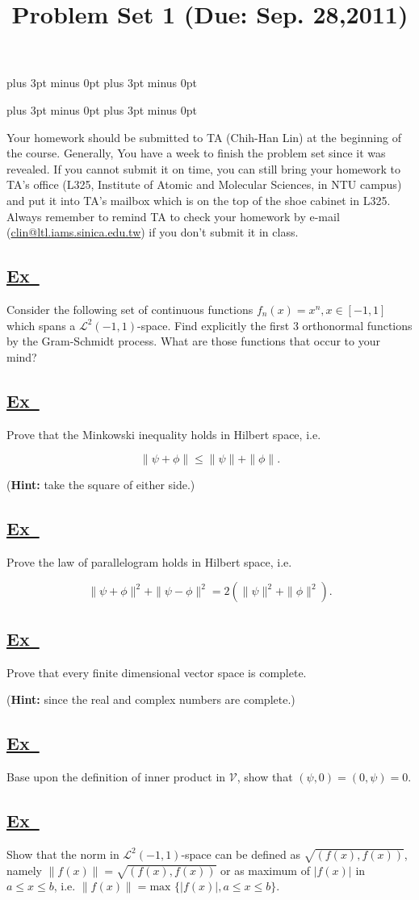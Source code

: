 \documentclass[a4paper,12pt]{article}
\newcommand{\excercise}{\addtocounter{section}{+1}
\subsection*{\underline{Ex~\thesection}}}
\newcommand{\norm}[1]{\|#1\|}
\begin{document}
\abovedisplayskip=-6pt plus 3pt minus 0pt
\belowdisplayskip=8pt plus 3pt minus 0pt

\abovedisplayshortskip=-6pt plus 3pt minus 0pt
\belowdisplayshortskip=8pt plus 3pt minus 0pt

\title{Problem Set 1 (Due: Sep. 28,2011)}
\maketitle

Your homework should be submitted to TA (Chih-Han Lin) at the  beginning of the course. Generally, You have a week to finish the problem set since it was revealed. If you cannot submit it on time, you can still bring your homework to TA's office (L325, Institute of Atomic and Molecular Sciences, in NTU campus) and put it into TA's mailbox which is on the top of the shoe cabinet in L325. Always remember to remind TA to check your homework by e-mail (\url{clin@ltl.iams.sinica.edu.tw}) if you don't submit it in class.

%

\excercise
Consider the following set of continuous functions $ f_n(x)=x^n,x\in [-1,1] $ which spans a $ \mathcal{L}^2(-1,1)$-space. Find explicitly the first 3 orthonormal functions by the Gram-Schmidt process. What are those functions that occur to your mind?

\excercise
Prove that the Minkowski inequality holds in Hilbert space, i.e.

$$
\norm{\psi+\phi}\leqslant\norm{\psi}+\norm{\phi}.
$$

(\textbf{Hint:} take the square of either side.)
\excercise
Prove the law of parallelogram holds in Hilbert space, i.e.

$$
\norm{\psi+\phi}^2+\norm{\psi-\phi}^2=2(\norm{\psi}^2+\norm{\phi}^2).
$$

\excercise
Prove that every finite dimensional vector space is complete. 

(\textbf{Hint:} since the real and complex numbers are complete.)

\excercise

Base upon the definition of inner product in $ \mathcal{V} $, show that $(\psi, 0)=(0, \psi)=0.$

\excercise
Show that the norm in $ \mathcal{L}^2(-1,1)$-space can be defined as $\sqrt{(f(x),f(x))}$, namely $\norm{f(x)}=\sqrt{(f(x),f(x))}$ or as maximum of $|f(x)|$ in $a\leqslant x\leqslant b$, i.e. $\norm{f(x)}=\mbox{max } \{|f(x)|, a\leqslant x\leqslant b\}$.
\end{document}
